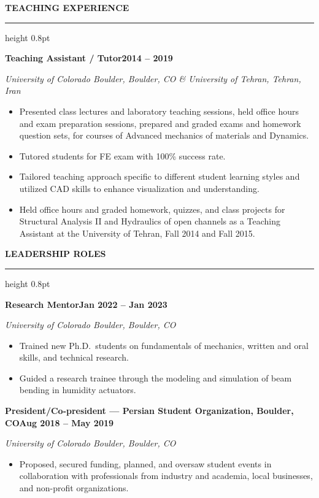 \documentclass[10pt, letterpaper]{article}
\newcommand{\rsection}[1]{%
  \vspace{8pt}%
  {\large\bfseries\MakeUppercase{#1}}%
  \vspace{1pt}%
  \hrule height 0.8pt%
  \vspace{4pt}%
}
\newcommand{\jobline}[2]{%
  \vspace{5pt}%
  \noindent\textbf{#1}\hfill\textbf{#2}\par%
  \vspace{1pt}%
}
\newcommand{\subline}[1]{%
  \vspace{-1pt}%
  \noindent\textit{#1}\par%
  \vspace{1pt}%
}
\newenvironment{rlist}{%
  \begin{itemize}[leftmargin=1.4em, itemsep=1pt, topsep=2pt, parsep=0pt]%
}{%
  \end{itemize}%
}
\begin{document}
\rsection{Teaching Experience}

\jobline{Teaching Assistant / Tutor}{2014 -- 2019}
\subline{University of Colorado Boulder, Boulder, CO \& University of Tehran, Tehran, Iran}
\begin{rlist}
  \item Presented class lectures and laboratory teaching sessions, held office hours and exam preparation sessions, prepared and graded exams and homework question sets, for courses of Advanced mechanics of materials and Dynamics.
  \item Tutored students for FE exam with 100\% success rate.
  \item Tailored teaching approach specific to different student learning styles and utilized CAD skills to enhance visualization and understanding.
  \item Held office hours and graded homework, quizzes, and class projects for Structural Analysis II and Hydraulics of open channels as a Teaching Assistant at the University of Tehran, Fall 2014 and Fall 2015.
\end{rlist}

\rsection{Leadership Roles}

\jobline{Research Mentor}{Jan 2022 -- Jan 2023}
\subline{University of Colorado Boulder, Boulder, CO}
\begin{rlist}
  \item Trained new Ph.D.\ students on fundamentals of mechanics, written and oral skills, and technical research.
  \item Guided a research trainee through the modeling and simulation of beam bending in humidity actuators.
\end{rlist}

\jobline{President/Co-president --- Persian Student Organization, Boulder, CO}{Aug 2018 -- May 2019}
\subline{University of Colorado Boulder, Boulder, CO}
\begin{rlist}
  \item Proposed, secured funding, planned, and oversaw student events in collaboration with professionals from industry and academia, local businesses, and non-profit organizations.
\end{rlist}
\end{document}
